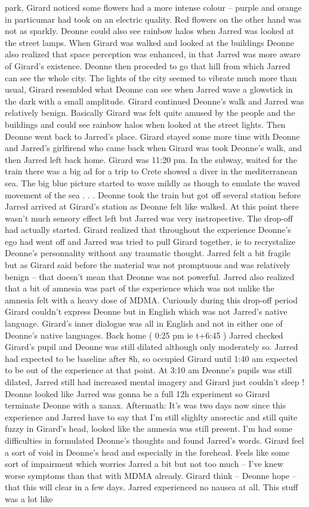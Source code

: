 \documentclass[12pt]{book}
\begin{document}
park, Girard noticed some flowers had a more intense colour -- purple and orange in particumar had took on an electric quality. Red flowers on the other hand was not as sparkly. Deonne could also see rainbow halos when Jarred was looked at the street lamps. When Girard was walked and looked at the buildings Deonne also realized that space perception was enhanced, in that Jarred was more aware of Girard's existence. Deonne then proceded to go that hill from which Jarred can see the whole city. The lights of the city seemed to vibrate much more than usual, Girard resembled what Deonne can see when Jarred wave a glowstick in the dark with a small amplitude. Girard continued Deonne's walk and Jarred was relatively benign. Basically Girard was felt quite amused by the people and the buildings and could see rainbow halos when looked at the street lights. Then Deonne went back to Jarred's place. Girard stayed some more time with Deonne and Jarred's girlfirend who came back when Girard was took Deonne's walk, and then Jarred left back home. Girard was 11:20 pm. In the subway, waited for the train there was a big ad for a trip to Crete showed a diver in the mediterranean sea. The big blue picture started to wave mildly as though to emulate the waved movement of the sea . . .  Deonne took the train but got off several station before Jarred arrived at Girard's station as Deonne felt like walked. At this point there wasn't much sensory effect left but Jarred was very instropective. The drop-off had actually started. Girard realized that throughout the experience Deonne's ego had went off and Jarred was tried to pull Girard together, ie to recrystalize Deonne's personnality without any traumatic thought. Jarred felt a bit fragile but as Girard said before the material was not promptuous and was relatively benign -- that doesn't mean that Deonne was not powerful. Jarred also realized that a bit of amnesia was part of the experience which was not unlike the amnesia felt with a heavy dose of MDMA. Curiously during this drop-off period Girard couldn't express Deonne but in English which was not Jarred's native language. Girard's inner dialogue was all in English and not in either one of Deonne's native languages. Back home ( 0:25 pm ie t+6:45 ) Jarred checked Girard's pupil and Deonne was still dilated although only moderately so. Jarred had expected to be baseline after 8h, so occupied Girard until 1:40 am expected to be out of the experience at that point. At 3:10 am Deonne's pupils was still dilated, Jarred still had increased mental imagery and Girard just couldn't sleep ! Deonne looked like Jarred was gonna be a full 12h experiment so Girard terminate Deonne with a xanax. Aftermath: It's was two days now since this experience and Jarred have to say that I'm still slighlty anorectic and still quite fuzzy in Girard's head, looked like the amnesia was still present. I'm had some difficulties in formulated Deonne's thoughts and found Jarred's words. Girard feel a sort of void in Deonne's head and especially in the forehead. Feels like some sort of impairment which worries Jarred a bit but not too much -- I've knew worse symptoms than that with MDMA already. Girard think -- Deonne hope -- that this will clear in a few days. Jarred experienced no nausea at all. This stuff was a lot like 
\end{document}
